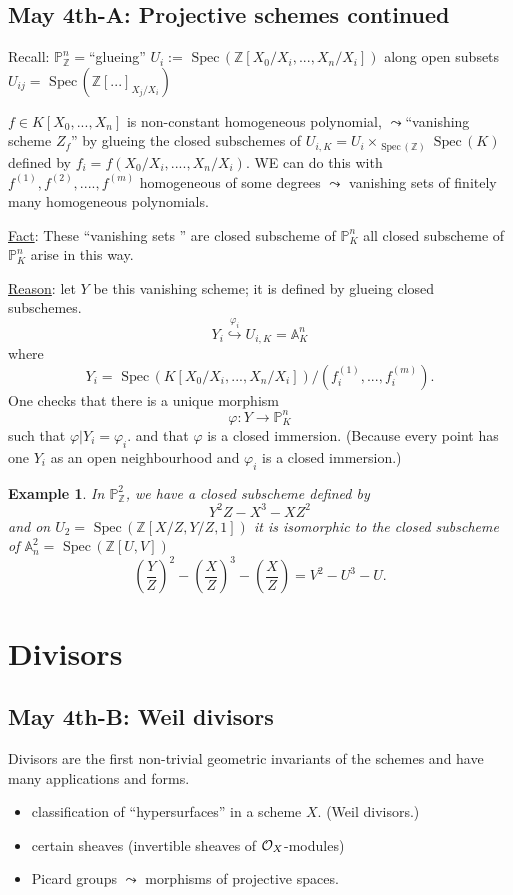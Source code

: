 \documentclass[11pt]{article}
\newtheorem{ex}[thm]{Example}
\newcommand{\spec}{\text{ Spec}\,}
\newcommand{\affn}{\mathbb A}
\newcommand{\proj}{\mathbb P}
\newcommand{\intg}{\mathbb Z}
\newcommand{\calo}{{\cal O}}
\newcommand{\lrta}{\longrightarrow}
\newcommand{\inj}{\hookrightarrow}
\begin{document}
\subsection{May 4th-A: Projective schemes continued}
Recall: $\proj^n_\intg=$``glueing'' $U_i:=\spec(\intg[
X_0/X_i,..., X_n/X_i])$ along open subsets $U_{ij}=\spec(\intg[...]_{X_j/X_i})$

$f\in K[X_0,...,X_n]$ is non-constant homogeneous polynomial, $\leadsto$``vanishing scheme $Z_f$'' by  glueing the closed subschemes of $U_{i,K}=U_i\times_{\spec(\intg)}\spec (K)$ defined by $f_i=f(X_0/X_i,....,X_n/X_i)$. WE can do this with $f^{(1)},f^{(2)},....,f^{(m)}$ homogeneous of some degrees $\leadsto $ vanishing sets of finitely many homogeneous polynomials.

\underline{Fact}: These ``vanishing sets '' are closed subscheme of $\proj^n_K$ all closed subscheme of $\proj^n_K$ arise in this way.

\underline{Reason}: let $Y$ be this vanishing scheme; it is defined by glueing closed subschemes.
$$
Y_i\overset{\varphi_i}{\inj} U_{i,K}=\affn^n_K
$$
where 
$$
Y_i=\spec(K[X_0/X_i,...,X_n/X_i])/(f_i^{(1)},...,f_i^{(m)}).  
$$
One checks that there is a unique morphism
$$
\varphi:Y\lrta \proj^n_K
$$
such that  $\varphi|Y_i=\varphi_i$. and that $\varphi$ is a closed immersion. (Because every point has one $Y_i$ as an open neighbourhood
and $\varphi_i$ is a closed immersion.)

\begin{ex}
In $\proj^2_\intg$, we have a closed subscheme defined by 
$$
Y^2Z-X^3-XZ^2
$$
and on $U_2=\spec(\intg[X/Z,Y/Z,1])$ it is isomorphic to the closed subscheme of $\affn^2_n=\spec(\intg[U,V])$
$$
\left(\frac{Y}{Z}\right)^2-\left(\frac{X}{Z}\right)^3-\left(\frac{X}{Z}\right)=V^2-U^3-U.
$$
\end{ex}


\section{Divisors}
\subsection{May 4th-B: Weil divisors}
Divisors are the first non-trivial geometric invariants of the schemes and have many applications and forms.
\begin{itemize}
	\item classification of ``hypersurfaces'' in a scheme $X$. (Weil divisors.)
	\item certain sheaves (invertible sheaves of $\calo_X$-modules)
	\item Picard groups $\leadsto$ morphisms of projective spaces.
\end{itemize}
\end{document}
